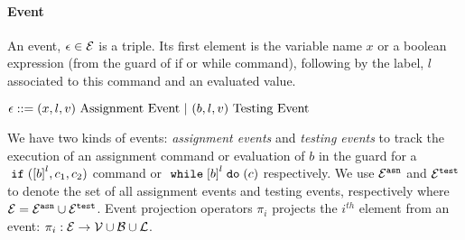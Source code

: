 

\paragraph{Event}
An event, $\mathtt{\epsilon} \in \mathcal{E}$ is a triple.
Its first element is the variable name $x$
or a boolean expression (from the guard of if or while command), 
following by 
the label, $l$ associated to this command and an evaluated value.
  \begin{center}
    $ \mathtt{\epsilon} ::= 
    ({x}, l, v) ~ \mbox{Assignment Event} 
    ~|~(b, l, v) ~ \mbox{Testing Event} $
  \end{center}
 We have two kinds of events: \emph{assignment events} and \emph{testing events} to track the execution of an assignment command or evaluation of $b$ in
 the guard for a $\eif(\clabel{b}^l, c_1, c_2)$ command or $\ewhile \clabel{b}^l \edo (c)$ respectively.
 We use $\mathcal{E}^{\mathtt{{asn}}}$ and $\mathcal{E}^{\mathtt{{test}}}$ to denote the set of all assignment events and testing events, respectively where $\mathcal{E} = \mathcal{E}^{\mathtt{{asn}}} \cup \mathcal{E}^{\mathtt{{test}}}$.
%
Event projection operators $\pi_i$ projects the $i^{th}$ element from an event: 
$\pi_i : \mathcal{E} \to \mathcal{V} \cup \mathcal{B} \cup \mathcal{L} $.

